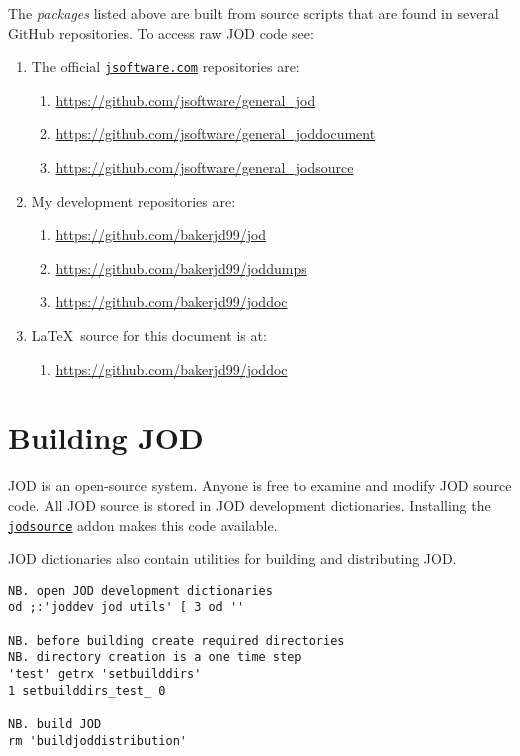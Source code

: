 The \emph{packages} listed above are built from source scripts that are found in several GitHub repositories. To access raw  
JOD code see:  

\begin{enumerate}
\item The official \href{https://www.jsoftware.com}{\texttt{jsoftware.com}} repositories are:
\begin{enumerate}
\item \url{https://github.com/jsoftware/general_jod}
\item \url{https://github.com/jsoftware/general_joddocument}
\item \url{https://github.com/jsoftware/general_jodsource}
\end{enumerate}

\item My development repositories are:
\begin{enumerate}
\item \url{https://github.com/bakerjd99/jod}
\item \url{https://github.com/bakerjd99/joddumps}
\item \url{https://github.com/bakerjd99/joddoc}
\end{enumerate}

\item \LaTeX\ source for this document is at:
\begin{enumerate}
\item \url{https://github.com/bakerjd99/joddoc}
\end{enumerate}

\end{enumerate}

 \newpage
    \section{Building JOD}
    
    JOD is an open-source system. Anyone is free to examine and modify JOD source code. 
    All JOD source is stored in JOD development dictionaries. Installing the
    \href{https://www.jsoftware.com/jwiki/Addons/general/jodsource}{\texttt{jodsource}}
    addon makes this code available. 
    
    JOD dictionaries also contain utilities for building and distributing JOD. 
    
\begin{lstlisting}[frame=single,framerule=0pt,basicstyle=\ttfamily\footnotesize]    
NB. open JOD development dictionaries
od ;:'joddev jod utils' [ 3 od ''

NB. before building create required directories
NB. directory creation is a one time step
'test' getrx 'setbuilddirs'
1 setbuilddirs_test_ 0

NB. build JOD
rm 'buildjoddistribution'
\end{lstlisting}   
    
